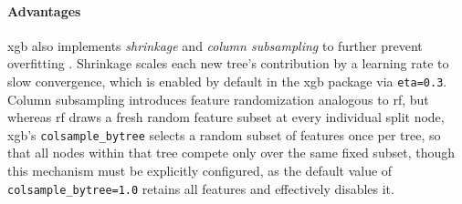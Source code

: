 \paragraph{Advantages}
\gls{xgb} also implements \textit{shrinkage} and \textit{column subsampling} to further prevent overfitting \parencite{chenXGBoostScalableTree2016}. Shrinkage scales each new tree's contribution by a learning rate to slow convergence, which is enabled by default in the \gls{xgb} package via \texttt{eta=0.3}. Column subsampling introduces feature randomization analogous to \gls{rf}, but whereas \gls{rf} draws a fresh random feature subset at every individual split node, \gls{xgb}'s \texttt{colsample\_bytree} selects a random subset of features once per tree, so that all nodes within that tree compete only over the same fixed subset, though this mechanism must be explicitly configured, as the default value of \texttt{colsample\_bytree=1.0} retains all features and effectively disables it.

